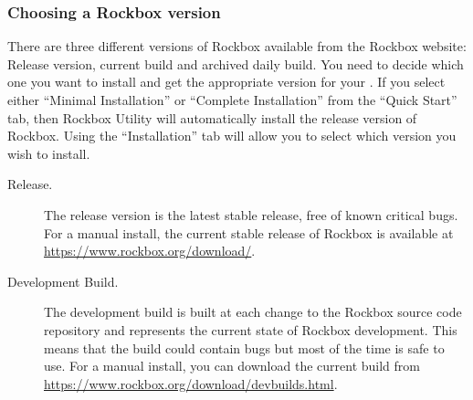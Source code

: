{{
}
\subsubsection{Choosing a Rockbox version}\label{sec:choosing_version}

There are three different versions of Rockbox available from the
Rockbox website:
\label{Version}
Release version, current build and archived daily build. You need to decide which one
you want to install and get the appropriate version for your \dap{}. If you
select either ``Minimal Installation'' or ``Complete Installation'' from the
``Quick Start'' tab, then Rockbox Utility will automatically install the
release version of Rockbox. Using the ``Installation'' tab will allow you
to select which version you wish to install.


\begin{description}

\item[Release.] The release version is the latest stable release, free
   of known critical bugs. For a manual install, the current stable release of Rockbox is
   available at \url{https://www.rockbox.org/download/}.

\item[Development Build.] The development build is built at each change to
  the Rockbox source code repository and represents the current state of Rockbox
  development. This means that the build could contain bugs but most of
  the time is safe to use. For a manual install, you can download the current build from
  \url{https://www.rockbox.org/download/devbuilds.html}.


\end{description}}
